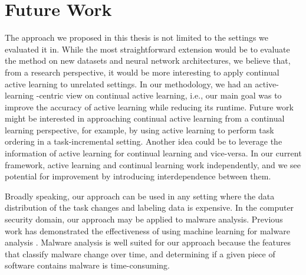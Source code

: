\section{Future Work}
\label{sec:Conclusion:FutureWork}
The approach we proposed in this thesis is not limited to the settings we evaluated it in. While the most straightforward extension would
be to evaluate the method on new datasets and neural network architectures, we believe that, from a research
perspective, it would be more interesting to apply continual active learning to unrelated settings. In our methodology, we had an active-learning
-centric view on continual active learning, i.e., our main goal was to improve the accuracy of active learning while reducing its runtime. Future
work might be interested in approaching continual active learning from a continual learning perspective, for example, by using active learning to
perform task ordering in a task-incremental setting. Another idea could be to leverage the information of active learning for continual learning
and vice-versa. In our current framework, active learning and continual learning work independently, and we see potential for improvement by 
introducing interdependence between them. \par
Broadly speaking, our approach can be used in any setting where the data distribution of the task changes and labeling data is expensive.
In the computer security domain, our approach may be applied to malware analysis. Previous work has demonstrated the effectiveness of using
machine learning for malware analysis \parencite{nath2014static,ijaz2019static}. Malware analysis is well suited for our approach
because the features that classify malware change over time, and determining if a given piece of software contains malware is time-consuming.